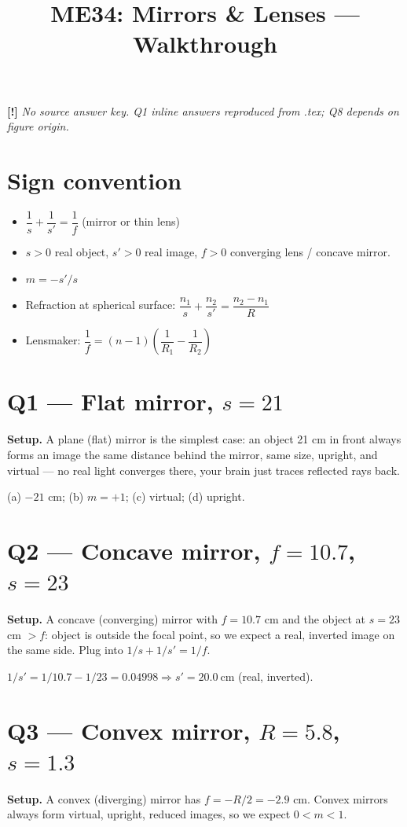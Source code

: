 \documentclass[11pt]{article}
\title{ME34: Mirrors \& Lenses --- Walkthrough}
\author{}\date{}
\newcommand{\warn}{\textbf{[!]}}
\begin{document}
\maketitle

\warn{} \emph{No source answer key. Q1 inline answers reproduced from .tex; Q8 depends on figure origin.}

\section*{Sign convention}
\begin{itemize}[leftmargin=*]
\item $\dfrac{1}{s}+\dfrac{1}{s'} = \dfrac{1}{f}$ (mirror or thin lens)
\item $s>0$ real object, $s'>0$ real image, $f>0$ converging lens / concave mirror.
\item $m = -s'/s$
\item Refraction at spherical surface: $\dfrac{n_1}{s}+\dfrac{n_2}{s'} = \dfrac{n_2-n_1}{R}$
\item Lensmaker: $\dfrac{1}{f} = (n-1)\!\left(\dfrac{1}{R_1}-\dfrac{1}{R_2}\right)$
\end{itemize}

\section*{Q1 --- Flat mirror, $s=21$}
\textbf{Setup.} A plane (flat) mirror is the simplest case: an object 21 cm in front always forms an image the same distance behind the mirror, same size, upright, and virtual --- no real light converges there, your brain just traces reflected rays back.

(a) $-21$ cm; (b) $m=+1$; (c) virtual; (d) upright.

\section*{Q2 --- Concave mirror, $f=10.7$, $s=23$}
\textbf{Setup.} A concave (converging) mirror with $f=10.7$ cm and the object at $s=23$ cm $> f$: object is outside the focal point, so we expect a real, inverted image on the same side. Plug into $1/s+1/s'=1/f$.

$1/s' = 1/10.7 - 1/23 = 0.04998 \Rightarrow s' = \boxed{20.0\ \text{cm}}$ (real, inverted).

\section*{Q3 --- Convex mirror, $R=5.8$, $s=1.3$}
\textbf{Setup.} A convex (diverging) mirror has $f = -R/2 = -2.9$ cm. Convex mirrors always form virtual, upright, reduced images, so we expect $0<m<1$.
\end{document}
